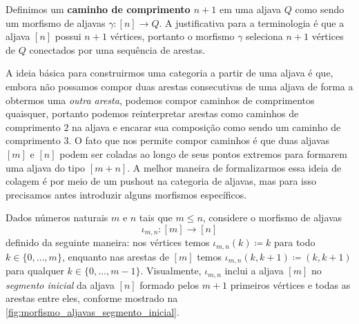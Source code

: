 Definimos um \textbf{caminho de comprimento $n+1$} em uma aljava $Q$ como sendo um morfismo de aljavas $\gamma: [n] \to Q$.
A justificativa para a terminologia é que a aljava $[n]$ possui $n+1$ vértices, portanto o morfismo $\gamma$ seleciona $n+1$ vértices de $Q$ conectados por uma sequência de arestas.

A ideia básica para construirmos uma categoria a partir de uma aljava é que, embora não possamos compor duas arestas consecutivas de uma aljava de forma a obtermos uma \emph{outra aresta}, podemos compor caminhos de comprimentos quaisquer, portanto podemos reinterpretar arestas como caminhos de comprimento $2$ na aljava e encarar sua composição como sendo um caminho de comprimento $3$.
O fato que nos permite compor caminhos é que duas aljavas $[m]$ e $[n]$ podem ser coladas ao longo de seus pontos extremos para formarem uma aljava do tipo $[m+n]$.
A melhor maneira de formalizarmos essa ideia de colagem é por meio de um pushout na categoria de aljavas, mas para isso precisamos antes introduzir alguns morfismos específicos.

Dados números naturais $m$ e $n$ tais que $m \leq n$, considere o morfismo de aljavas
\begin{displaymath}
    \iota_{m,n}: [m] \to [n]
\end{displaymath}
definido da seguinte maneira: nos vértices temos $\iota_{m,n}(k) \coloneqq k$ para todo $k \in \{0,\dots,m\}$, enquanto nas arestas de $[m]$ temos $\iota_{m,n}(k,k+1) \coloneqq (k,k+1)$ para qualquer $k \in \{0,\dots,m-1\}$.
Visualmente, $\iota_{m,n}$ inclui a aljava $[m]$ no \emph{segmento inicial} da aljava $[n]$ formado pelos $m+1$ primeiros vértices e todas as arestas entre eles, conforme mostrado na \cref{fig:morfismo_aljavas_segmento_inicial}.

